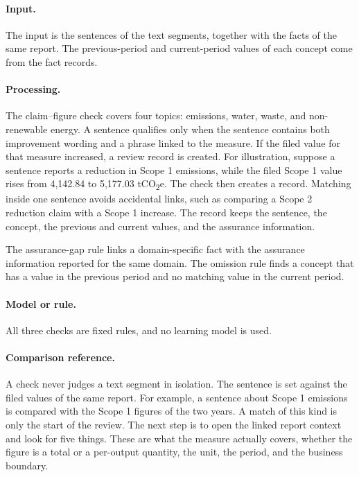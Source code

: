 \paragraph{Input.} The input is the sentences of the text segments, together with the facts of the same report. The previous-period and current-period values of each concept come from the fact records.

\paragraph{Processing.} The claim--figure check covers four topics: emissions, water, waste, and non-renewable energy. A sentence qualifies only when the sentence contains both improvement wording and a phrase linked to the measure. If the filed value for that measure increased, a review record is created. For illustration, suppose a sentence reports a reduction in Scope 1 emissions, while the filed Scope 1 value rises from 4,142.84 to 5,177.03 tCO\textsubscript{2}e. The check then creates a record. Matching inside one sentence avoids accidental links, such as comparing a Scope 2 reduction claim with a Scope 1 increase. The record keeps the sentence, the concept, the previous and current values, and the assurance information.

The assurance-gap rule links a domain-specific fact with the assurance information reported for the same domain. The omission rule finds a concept that has a value in the previous period and no matching value in the current period.

\paragraph{Model or rule.} All three checks are fixed rules, and no learning model is used.

\paragraph{Comparison reference.} A check never judges a text segment in isolation. The sentence is set against the filed values of the same report. For example, a sentence about Scope 1 emissions is compared with the Scope 1 figures of the two years. A match of this kind is only the start of the review. The next step is to open the linked report context and look for five things. These are what the measure actually covers, whether the figure is a total or a per-output quantity, the unit, the period, and the business boundary.

